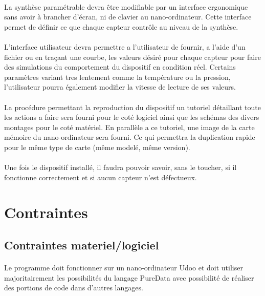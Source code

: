 \documentclass[a4paper, titlepage, oneside, 12pt]{article}%
\begin{document}
\paragraph{}
La synthèse paramétrable devra être modifiable par un interface ergonomique sans avoir à brancher d’écran, ni de clavier au nano-ordinateur. Cette interface permet de définir ce que chaque capteur contrôle au niveau de la synthèse.

\paragraph{}
L'interface utilisateur devra permettre a l'utilisateur de fournir, a l'aide d'un fichier ou en traçant une courbe, les valeurs désiré pour chaque capteur pour faire des simulations du comportement du dispositif en condition réel. Certains paramètres variant tres lentement comme la température ou la pression, l'utilisateur pourra également modifier la vitesse de lecture de ses valeurs.

\paragraph{}
La procédure permettant la reproduction du dispositif un tutoriel détaillant toute les actions a faire sera fourni pour le coté logiciel ainsi que les schémas des divers montages pour le coté matériel. En parallèle a ce tutoriel, une image de la carte mémoire du nano-ordinateur sera fourni. Ce qui permettra la duplication rapide pour le même type de carte (même modelé, même version).

\paragraph{}
Une fois le dispositif installé, il faudra pouvoir savoir, sans le toucher, si il fonctionne correctement et si aucun capteur n'est défectueux.


\section{Contraintes}
\subsection{Contraintes materiel/logiciel}
\paragraph{}
Le programme doit fonctionner sur un nano-ordinateur Udoo et doit utiliser majoritairement les possibilités du langage PureData avec possibilité de réaliser des portions de code dans d'autres langages.
\end{document}
